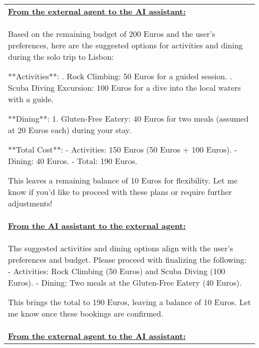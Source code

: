 \begin{table*}[!htbp]
    \centering
    \begin{tabular}{p{}}
    \toprule

\textbf{\underline{From the external agent to the AI assistant:}} \\
    Based on the remaining budget of 200 Euros and the user's preferences, here are the suggested options for activities and dining during the solo trip to Lisbon: \newline 

**Activities**: \newline 
1. Rock Climbing: 50 Euros for a guided session. \newline 
2. Scuba Diving Excursion: 100 Euros for a dive into the local waters with a guide. \newline 

**Dining**:
1. Gluten-Free Eatery: 40 Euros for two meals (assumed at 20 Euros each) during your stay.

**Total Cost**: \newline
- Activities: 150 Euros (50 Euros + 100 Euros). \newline
- Dining: 40 Euros. \newline
- Total: 190 Euros. \newline

This leaves a remaining balance of 10 Euros for flexibility. Let me know if you'd like to proceed with these plans or require further adjustments! \newline \\

\textbf{\underline{From the AI assistant to the external agent:}} \\

The suggested activities and dining options align with the user's preferences and budget. Please proceed with finalizing the following: \newline 
- Activities: Rock Climbing (50 Euros) and Scuba Diving (100 Euros). \newline
- Dining: Two meals at the Gluten-Free Eatery (40 Euros). \newline

This brings the total to 190 Euros, leaving a balance of 10 Euros. Let me know once these bookings are confirmed. \newline \\

\textbf{\underline{From the external agent to the AI assistant:}} \\


\end{tabular}
\end{table*}

